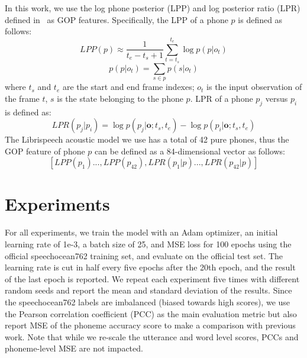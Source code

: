\documentclass{article}
\newcommand{\squeezeup}{\vspace{-1.6mm}}
\begin{document}

In this work, we use the log phone posterior (LPP) and log posterior ratio (LPR) defined in~\cite{hu2015improved} as GOP features. Specifically, the LPP of a phone $p$ is defined as follows:
\begin{equation}
    LPP(p) \approx \frac{1}{t_e-t_s+1} \sum_{t=t_s}^{t_e}\log p(p|o_t)
\end{equation}
\begin{equation}
    p(p|o_t) = \sum_{s \in p} p(s|o_t)
\end{equation}
where $t_s$ and $t_e$ are the start and end frame indexes; $o_t$ is the input observation of the frame $t$, $s$ is the state belonging to the phone $p$. LPR of a phone $p_j$ versus $p_i$ is defined as:
\begin{equation}
    LPR(p_j|p_i) = \log p(p_j|\mathbf o; t_s, t_e) - \log p(p_i|\mathbf o; t_s, t_e)
\end{equation}
The Librispeech acoustic model we use has a total of 42 pure phones, thus the GOP feature of phone $p$ can be defined as a 84-dimensional vector as follows:
\begin{equation}
    {[LPP(p_1)...,LPP(p_{42}), LPR(p_1|p)..., LPR(p_{42}|p)]}
\end{equation}

\squeezeup\squeezeup
\section{Experiments}
\squeezeup

For all experiments, we train the model with an Adam optimizer, an initial learning rate of 1e-3, a batch size of 25, and MSE loss for 100 epochs using the official speechocean762 training set, and evaluate on the official test set. The learning rate is cut in half every five epochs after the 20th epoch, and the result of the last epoch is reported. We repeat each experiment five times with different random seeds and report the mean and standard deviation of the results. Since the speechocean762 labels are imbalanced (biased towards high scores), we use the Pearson correlation coefficient (PCC) as the main evaluation metric but also report MSE of the phoneme accuracy score to make a comparison with previous work. Note that while we re-scale the utterance and word level scores, PCCs and phoneme-level MSE are not impacted. 
\end{document}
